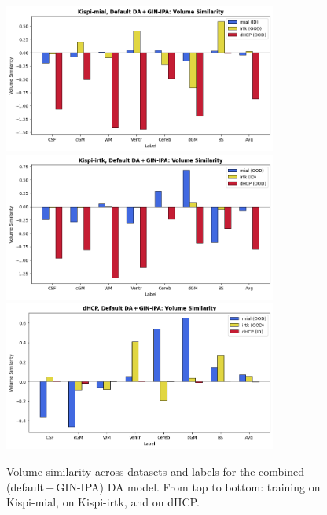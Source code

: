 \begin{figure}[htbp]
    \centering
    \includegraphics[width=0.8\textwidth]{figures/mial_both_VS.png}\\
    \vspace{10pt}
    \includegraphics[width=0.8\textwidth]{figures/irtk_both_VS.png}\\
    \vspace{10pt}
    \includegraphics[width=0.8\textwidth]{figures/dHCP_both_VS.png}
    \caption{Volume similarity across datasets and labels for the combined (default\,+\,GIN-IPA) DA model. From top to bottom: training on Kispi-mial, on Kispi-irtk, and on dHCP.}
    \label{fig:both_VS}
\end{figure}

